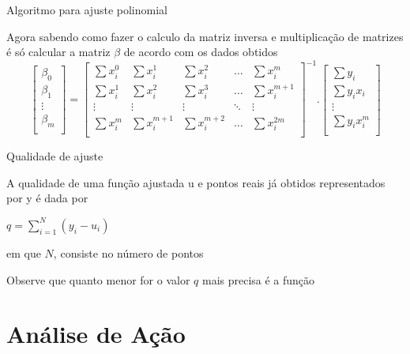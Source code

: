 \documentclass[10pt]{beamer}
\begin{document}
\begin{frame}{Algoritmo para ajuste polinomial}

  Agora sabendo como fazer o calculo da matriz inversa e multiplicação de matrizes é só calcular a matriz $\beta$ de acordo com os dados obtidos
  \[
    \begin{bmatrix}
      \beta_0 \\
      \beta_1 \\
      \vdots  \\
      \beta_m \\
    \end{bmatrix}
    =
    \begin{bmatrix}
      \sum{x_{i}^{0}} & \sum{x_{i}^{1}} & \sum{x_{i}^{2}} & \dots  & \sum{x_{i}^{m}} \\
      \sum{x_{i}^{1}} & \sum{x_{i}^{2}} & \sum{x_{i}^{3}} & \dots & \sum{x_{i}^{m+1}}\\
      \vdots & \vdots & \vdots & \ddots & \vdots \\
      \sum{x_{i}^{m}} & \sum{x_{i}^{m+1}} & \sum{x_{i}^{m+2}} & \dots  & \sum{x_{i}^{2m}} \\
    \end{bmatrix}^{-1}
    .
    \begin{bmatrix}
      \sum{y_{i}} \\
      \sum{y_{i}x_{i}}\\
      \vdots \\
      \sum{y_{i}x_{i}^{m}} \\
    \end{bmatrix}
  \]
\end{frame}

\begin{frame}{Qualidade de ajuste}

    A qualidade de uma função ajustada u e pontos reais já obtidos representados por y é dada por
    \begin{center}
        $q = \sum_{i=1}^{N} (y_{i}-u_{i})$
    \end{center}
    em que $N$, consiste no número de pontos
    
    Observe que quanto menor for o valor $q$ mais precisa é a função
\end{frame}

\section{Análise de Ação}
\end{document}
